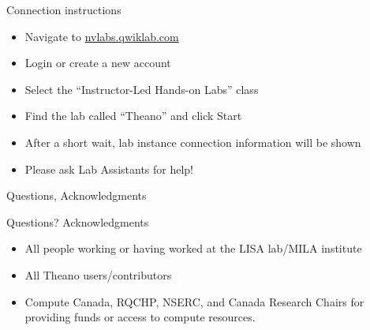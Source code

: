 \documentclass[utf8x,xcolor=pdftex,dvipsnames,table]{beamer}
\begin{document}
\begin{frame}{Connection instructions}
\begin{itemize}
\item Navigate to \url{nvlabs.qwiklab.com}
\item Login or create a new account
\item Select the ``Instructor-Led Hands-on Labs'' class
\item Find the lab called ``Theano'' and click Start
\item After a short wait, lab instance connection information will be shown
\item Please ask Lab Assistants for help!
\end{itemize}
\end{frame}

\begin{frame}{Questions, Acknowledgments}
\Huge
\begin{center}
Questions?\newline
Acknowledgments
\end{center}
\normalsize
\begin{itemize}
\item All people working or having worked at the LISA lab/MILA institute
\item All Theano users/contributors
\item Compute Canada, RQCHP, NSERC, and Canada Research Chairs for providing funds or access to compute resources.
\end{itemize}

\end{frame}
\end{document}
